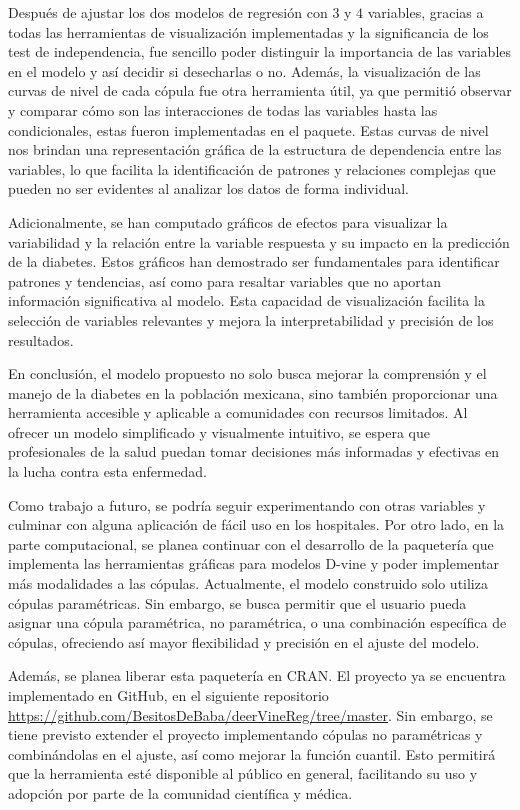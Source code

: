 Después de ajustar los dos modelos de regresión con $3$ y $4$ variables, gracias a todas las herramientas de visualización implementadas y la significancia de los test de independencia, fue sencillo poder distinguir la importancia de las variables en el modelo y así decidir si desecharlas o no. Además, la visualización de las curvas de nivel de cada cópula fue otra herramienta útil, ya que permitió observar y comparar cómo son las interacciones de todas las variables hasta las condicionales, estas fueron implementadas en el paquete. Estas curvas de nivel nos brindan una representación gráfica de la estructura de dependencia entre las variables, lo que facilita la identificación de patrones y relaciones complejas que pueden no ser evidentes al analizar los datos de forma individual.

Adicionalmente, se han computado gráficos de efectos para visualizar la variabilidad y la relación entre la variable respuesta y su impacto en la predicción de la diabetes. Estos gráficos han demostrado ser fundamentales para identificar patrones y tendencias, así como para resaltar variables que no aportan información significativa al modelo. Esta capacidad de visualización facilita la selección de variables relevantes y mejora la interpretabilidad y precisión de los resultados.

En conclusión, el modelo propuesto no solo busca mejorar la comprensión y el manejo de la diabetes en la población mexicana, sino también proporcionar una herramienta accesible y aplicable a comunidades con recursos limitados. Al ofrecer un modelo simplificado y visualmente intuitivo, se espera que profesionales de la salud puedan tomar decisiones más informadas y efectivas en la lucha contra esta enfermedad.

Como trabajo a futuro, se podría seguir experimentando con otras variables y culminar con alguna aplicación de fácil uso en los hospitales. Por otro lado, en la parte computacional, se planea continuar con el desarrollo de la paquetería que implementa las herramientas gráficas para modelos D-vine y poder implementar más modalidades a las cópulas. Actualmente, el modelo construido solo utiliza cópulas paramétricas. Sin embargo, se busca permitir que el usuario pueda asignar una cópula paramétrica, no paramétrica, o una combinación específica de cópulas, ofreciendo así mayor flexibilidad y precisión en el ajuste del modelo. 

Además, se planea liberar esta paquetería en CRAN. El proyecto ya se encuentra implementado en GitHub, en el siguiente repositorio \url{https://github.com/BesitosDeBaba/deerVineReg/tree/master}. Sin embargo, se tiene previsto extender el proyecto implementando cópulas no paramétricas y combinándolas en el ajuste, así como mejorar la función cuantil. Esto permitirá que la herramienta esté disponible al público en general, facilitando su uso y adopción por parte de la comunidad científica y médica.